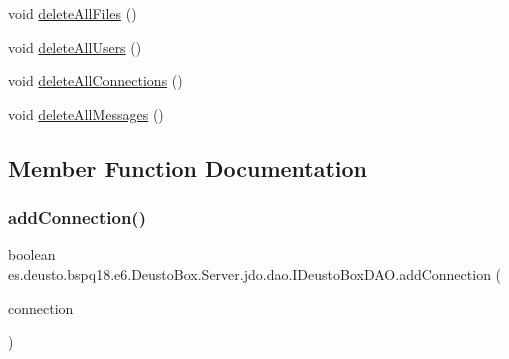 \begin{DoxyCompactItemize}
\item 
void \mbox{\hyperlink{interfacees_1_1deusto_1_1bspq18_1_1e6_1_1_deusto_box_1_1_server_1_1jdo_1_1dao_1_1_i_deusto_box_d_a_o_ad6fb592fdf61b9d06005b8ef8d3c4122}{delete\+All\+Files}} ()
\item 
void \mbox{\hyperlink{interfacees_1_1deusto_1_1bspq18_1_1e6_1_1_deusto_box_1_1_server_1_1jdo_1_1dao_1_1_i_deusto_box_d_a_o_a7b65c1c448a4692ae3502a0bfd1351ef}{delete\+All\+Users}} ()
\item 
void \mbox{\hyperlink{interfacees_1_1deusto_1_1bspq18_1_1e6_1_1_deusto_box_1_1_server_1_1jdo_1_1dao_1_1_i_deusto_box_d_a_o_aaa74b50c17c4bdfd4a8868a180375cde}{delete\+All\+Connections}} ()
\item 
void \mbox{\hyperlink{interfacees_1_1deusto_1_1bspq18_1_1e6_1_1_deusto_box_1_1_server_1_1jdo_1_1dao_1_1_i_deusto_box_d_a_o_a36f3a3c62685fcc84f0d48ec4717814d}{delete\+All\+Messages}} ()
\end{DoxyCompactItemize}


\subsection{Member Function Documentation}
\mbox{\label{interfacees_1_1deusto_1_1bspq18_1_1e6_1_1_deusto_box_1_1_server_1_1jdo_1_1dao_1_1_i_deusto_box_d_a_o_aee8406e88334179d4692d118e6ba221d}} 
\subsubsection{\texorpdfstring{add\+Connection()}{addConnection()}}
{\footnotesize\ttfamily boolean es.\+deusto.\+bspq18.\+e6.\+Deusto\+Box.\+Server.\+jdo.\+dao.\+I\+Deusto\+Box\+D\+A\+O.\+add\+Connection (\begin{DoxyParamCaption}\item[{\mbox{\hyperlink{classes_1_1deusto_1_1bspq18_1_1e6_1_1_deusto_box_1_1_server_1_1jdo_1_1data_1_1_d_connection}{D\+Connection}}}]{connection }\end{DoxyParamCaption})}



